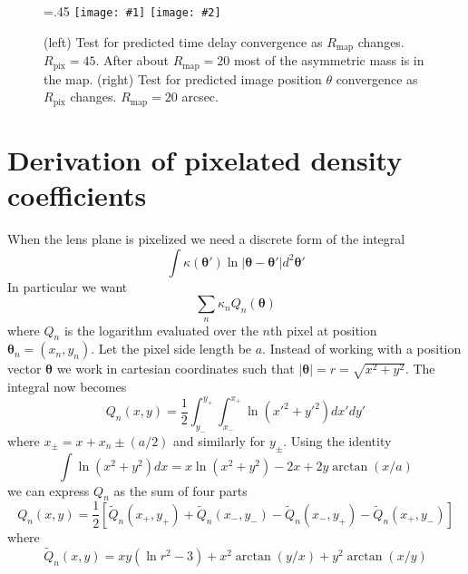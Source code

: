 \documentclass[onecolumn,galley]{mn2e}
\newcommand{\Rmap}{\ensuremath{R_\mathrm{map}}}
\newcommand{\Rpix}{\ensuremath{R_\mathrm{pix}}}
\renewcommand{\vec}[1]{\ensuremath{\boldsymbol{#1}}}
\newcommand\plottwo[2]{{%
 \centering
 \leavevmode
 \columnwidth=.45\columnwidth
 \texttt{[image: \#1]}%
 \hfil
 \texttt{[image: \#2]}%
}}%
\begin{document}
\begin{figure}
\plottwo{tdconv_pr45.pdf}{imgpos_conv_mr20.pdf}
\caption{(left) Test for predicted time delay convergence as $\Rmap$ changes.
$\Rpix=45$. After about $\Rmap=20$ most of the asymmetric mass is in the map.
(right) Test for predicted image position $\theta$ convergence as $\Rpix$
changes. $\Rmap=20$ arcsec.}
\label{raytracing convergence tests}
\end{figure}

\section{Derivation of pixelated density coefficients}
\label{Q derivation}
When the lens plane is pixelized we need a discrete form of the integral
%
\[\int \kappa(\vec\theta') \ln |\vec\theta-\vec\theta'| d^2\vec\theta' \]
%
In particular we want
%
\[\sum_n \kappa_n Q_n(\vec\theta)\]
%
where $Q_n$ is the logarithm evaluated over the $n$th pixel at position $\vec\theta_n = (x_n, y_n)$. Let the pixel side length be $a$.
Instead of working with a position vector $\vec\theta$ we work in cartesian coordinates such that
%
$|\vec\theta| = r = \sqrt{x^2 + y^2}$. The integral now becomes
%
\[Q_n(x,y) = \frac12 \int_{y_-}^{y_+}\int_{x_-}^{x_+} \ln (x'^2+y'^2) dx' dy'\]
%
where $x_\pm = x + x_n \pm (a/2)$ and similarly for $y_\pm$.
Using the identity
%
\[\int \ln(x^2+y^2) dx = x \ln(x^2+y^2) - 2x + 2y\arctan(x/a) \]
%
we can express $Q_n$ as the sum of four parts
%
\[Q_n(x,y) = \frac12 \left[ \tilde Q_n(x_+,y_+)
        + \tilde Q_n(x_-,y_-)
        - \tilde Q_n(x_-,y_+)
        - \tilde Q_n(x_+,y_-) \right]\]
%
where
%
\[\tilde Q_n(x,y) = xy(\ln r^2 - 3) + x^2\arctan(y/x) + y^2\arctan(x/y)\]



\end{document}
